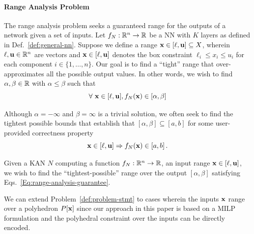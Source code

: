 \paragraph{Range Analysis Problem }
The range analysis problem seeks a guaranteed range for the outputs of a network given a set of inputs. Let $f_N: \mathbb{R}^{n} \rightarrow \mathbb{R}$ be a NN with $K$ layers as defined in Def.~\ref{def:general-nn}. Suppose we define a range $\mathbf{x} \in [\mathbf{\ell}, \mathbf{u}] \subseteq X$, wherein $\mathbf{\ell}, \mathbf{u} \in \mathbb{R}^n$ are vectors and $\mathbf{x} \in [\mathbf{\ell}, \mathbf{u}]$ denotes the box constraint $\ell_i \leq x_i \leq u_i$ for each component $i \in \{1, \ldots, n\}$. Our goal is to find a ``tight'' range that over-approximates all the possible output values. In other words, we wish to find $\alpha, \beta \in \mathbb{R}$ with $\alpha \leq \beta$ such that
\begin{equation} \label{Eq:range-analysis-guarantee}
	\forall\ \mathbf{x} \in [\mathbf{\ell}, \mathbf{u}], f_N(\mathbf{x}) \in [\alpha, \beta]
\end{equation}

Although $\alpha = -\infty$ and $\beta = \infty$ is a trivial solution, we often seek to find the tightest possible bounds that establish that $[\alpha, \beta] \subseteq [a, b]$ for some user-provided correctness property
\[ \mathbf{x} \in [\mathbf{\ell}, \mathbf{u}] \Rightarrow f_N(\mathbf{x}) \in [a, b]\,.\]

\begin{problem}\label{def:problem-stmt}
Given a KAN $N$ computing a function $f_N: \mathbb{R}^n \rightarrow \mathbb{R}$, an input range $\mathbf{x} \in [\mathbf{\ell}, \mathbf{u}]$, we wish to find  the ``tightest-possible'' range over the output $[\alpha, \beta]$ satisfying Eqs.~\eqref{Eq:range-analysis-guarantee}.
\end{problem}

We can extend Problem~\ref{def:problem-stmt} to  cases wherein the inputs $\mathbf{x}$ range over a polyhedron $P[\mathbf{x}]$ since our approach in this paper is based on a MILP formulation and the polyhedral constraint over the inputs can be directly encoded.

